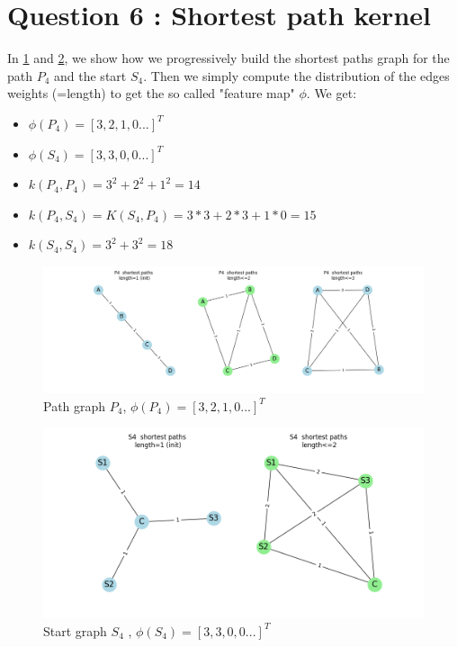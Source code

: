 \documentclass[a4paper]{article}
\begin{document}
\section{Question 6 : Shortest path kernel}
In \ref{fig:P4_shortest_paths_computation} and \ref{fig:S4_shortest_paths_computation}, we show 
how we progressively build the shortest paths graph for the path $P_4$ and the start $S_4$.
Then we simply compute the distribution of the edges weights (=length) to get the so called "feature map" $\phi$.
We get:
\begin{itemize}
    \item $\phi(P_4)=[3, 2, 1, 0 ...]^T$
    \item $\phi(S_4)=[3, 3, 0, 0 ...]^T$
    \item $k(P_4, P_4) = 3^2 + 2^2 + 1^2 = 14$
    \item $k(P_4, S_4) = K(S_4, P_4) = 3*3+2*3+1*0 = 15$
    \item $k(S_4, S_4) = 3^2 + 3^2 = 18$
\end{itemize}

\begin{figure}[ht]
        \centering
        \includegraphics[width=1.\textwidth]{figures/P4_shortest_paths_computation.png}
        \caption{Path graph $P_4$, $\phi(P_4)=[3, 2, 1, 0 ...]^T$}
        \label{fig:P4_shortest_paths_computation}
\end{figure}

\begin{figure}[ht]
    \centering
    \includegraphics[width=.6\textwidth]{figures/S4_shortest_paths_computation.png}
    \caption{Start graph $S_4$ , $\phi(S_4)=[3, 3, 0, 0 ...]^T$}
    \label{fig:S4_shortest_paths_computation}
\end{figure}
\end{document}

